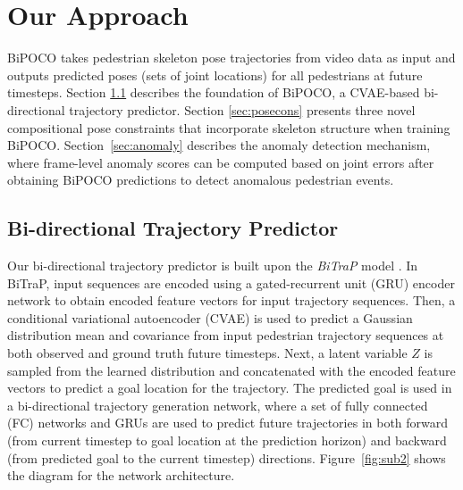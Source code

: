 \documentclass[nohyperref]{article}
\theoremstyle{plain}
\theoremstyle{definition}
\theoremstyle{remark}
\begin{document}
\vspace{-3mm}

\section{Our Approach}
\label{sec:method}
\vspace{-2mm}
BiPOCO takes pedestrian skeleton pose trajectories from video data as input and outputs predicted poses (sets of joint locations) for all pedestrians at future timesteps. Section \ref{sec:bitrap} describes the foundation of BiPOCO, a CVAE-based bi-directional trajectory predictor. Section \ref{sec:posecons} presents three novel compositional pose constraints that incorporate  skeleton structure when training BiPOCO. Section~\ref{sec:anomaly} describes the anomaly detection mechanism, where frame-level anomaly  scores can be computed based on joint errors after obtaining BiPOCO predictions to detect anomalous pedestrian events. 

\vspace{-3mm}

\subsection{Bi-directional Trajectory Predictor}
\label{sec:bitrap}
\vspace{-2mm}
Our bi-directional trajectory predictor is built upon the \textit{BiTraP} model \cite{yao2021bitrap}. In BiTraP,  input sequences are encoded using a gated-recurrent unit (GRU) encoder network to obtain encoded feature vectors for input trajectory sequences. Then, a conditional variational autoencoder (CVAE) is used to predict a Gaussian distribution mean and covariance from input pedestrian trajectory sequences at both observed and ground truth future timesteps. Next, a latent variable $Z$ is sampled from the learned distribution and concatenated with the encoded feature vectors to predict a goal location for the trajectory. The predicted goal is used in a bi-directional trajectory generation network, where a set of fully connected (FC) networks and GRUs are used to predict future trajectories in both forward (from current timestep to goal location at the prediction horizon) and backward (from predicted goal to the current timestep) directions. Figure~\ref{fig:sub2} shows the diagram for the network architecture. 
\end{document}
